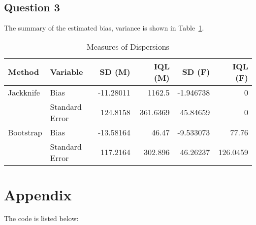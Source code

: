 \documentclass{article}
\begin{document}
\subsection{Question 3}
The summary of the estimated bias, variance is shown in
Table~\ref{tab:bv}.

\begin{table}[ht!]
\begin{center}
\begin{tabular}{|l|l|r|r|r|r|}
                                                  \hline
Method     & Variable        &  SD (M)   & IQL (M)  & SD (F)    & IQL (F) \\ \hline
Jackknife  & Bias            & -11.28011 &   1162.5 & -1.946738 & 0 \\ 
           & Standard Error  &  124.8158 & 361.6369 &  45.84659 & 0 \\ \hline
Bootstrap  & Bias            & -13.58164 &    46.47 & -9.533073 & 77.76 \\
           & Standard Error  &  117.2164 &  302.896 &  46.26237 & 126.0459 \\ \hline
    \end{tabular}
  \end{center}
  \caption{Measures of Dispersions \label{tab:bv}}
\end{table}

\section{Appendix}
The code is listed below:


 
\end{document}
